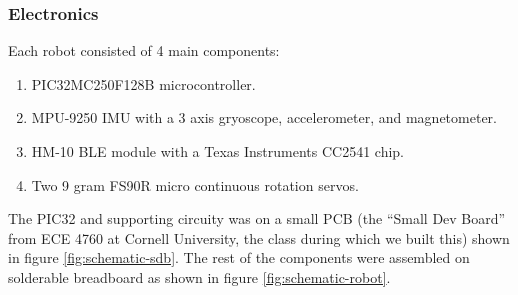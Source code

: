 \documentclass[]{article}
\begin{document}
\hypertarget{electronics}{%
\subsubsection{Electronics}\label{electronics}}

Each robot consisted of 4 main components:
\begin{enumerate}
  \item PIC32MC250F128B microcontroller.
  \item MPU-9250 IMU with a 3 axis gryoscope, accelerometer, and magnetometer.
  \item HM-10 BLE module with a Texas Instruments CC2541 chip.
  \item Two 9 gram FS90R micro continuous rotation servos.
\end{enumerate}

The PIC32 and supporting circuity was on a small PCB (the ``Small Dev Board'' from ECE 4760 at Cornell University, the class during which we built this) shown in figure \ref{fig:schematic-sdb}. The rest of the components were assembled on solderable breadboard as shown in figure \ref{fig:schematic-robot}.
\end{document}
